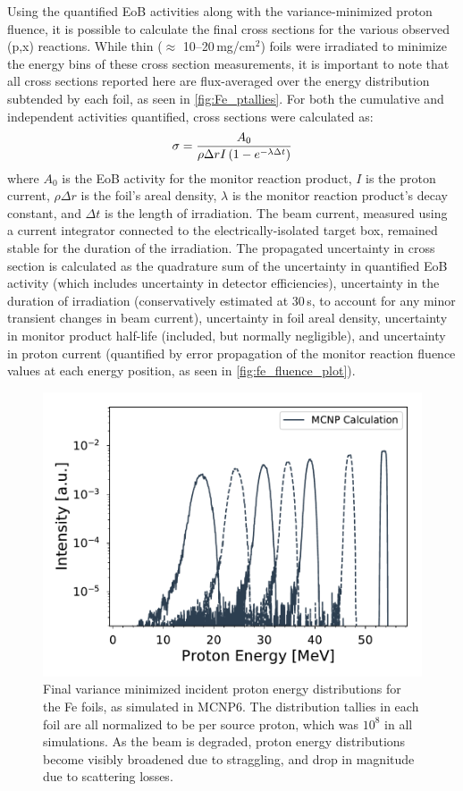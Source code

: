 Using the quantified EoB activities along with the variance-minimized proton fluence, it is possible to calculate the final cross sections for the various observed (p,x) reactions.
While thin ($\approx$ 10--20\,mg/cm$^2$)  foils were irradiated to minimize the energy bins of these cross section measurements, it is important to note that all cross sections reported here are flux-averaged  
over the energy distribution subtended by each foil, as seen in \autoref{fig:Fe_ptallies}.
For both the cumulative and independent activities quantified, cross sections were calculated as:
\begin{equation}
\sigma = \dfrac{A_0 }{\rho \Delta r I \left( 1-e^{-\lambda \Delta t}\right) }
\end{equation}
where $A_0$ is the EoB activity for the monitor reaction product, $I$ is the proton current, $\rho \Delta r$ is the foil's areal density, $\lambda$ is the monitor reaction product's decay constant, and $\Delta t$ is the length of irradiation.
The beam current, measured using a current integrator connected to the electrically-isolated target box, remained stable for the duration of the irradiation.
The propagated uncertainty in cross section is calculated as the quadrature sum of the uncertainty in quantified EoB activity (which includes uncertainty in detector efficiencies), uncertainty in the duration of irradiation (conservatively estimated at 30\,s, to account for any minor transient changes in beam current), uncertainty in foil areal density, uncertainty in monitor product half-life (included, but normally negligible),  and uncertainty in proton current (quantified by error propagation of the monitor reaction fluence values  at each energy position, as seen in \autoref{fig:fe_fluence_plot}).


\begin{figure}
 \centering
 \includegraphics[width=0.5\linewidth]{./figures/Fe_mcnp_spectrum.pdf}
 \caption{ Final variance minimized incident proton energy distributions for the Fe foils, as simulated in MCNP6. The distribution tallies in each foil are all normalized to be per source proton, which was $10^8$ in all simulations. As the beam is degraded, proton energy distributions become visibly broadened due to straggling, and drop in magnitude due to scattering losses.}
 \label{fig:Fe_ptallies}
\end{figure}


